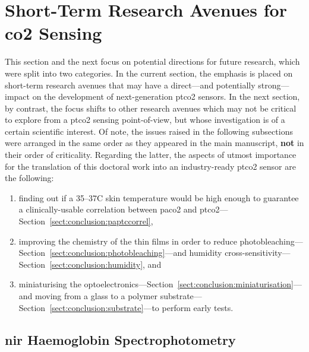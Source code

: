 \section{Short-Term Research Avenues for \texorpdfstring{\gls{co2}}{CO2} Sensing}\label{sect:conclusion:short_term}

This section and the next focus on potential directions for future research, which were split into two categories. In the current section, the emphasis is placed on short-term research avenues that may have a direct---and potentially strong---impact on the development of next-generation \gls{ptco2} sensors. In the next section, by contrast, the focus shifts to other research avenues which may not be critical to explore from a \gls{ptco2} sensing point-of-view, but whose investigation is of a certain scientific interest. Of note, the issues raised in the following subsections were arranged in the same order as they appeared in the main manuscript, \textbf{not} in their order of criticality. Regarding the latter, the aspects of utmost importance for the translation of this doctoral work into an industry-ready \gls{ptco2} sensor are the following:
\begin{enumerate}
	\item finding out if a 35--37{\degree}C skin temperature would be high enough to guarantee a clinically-usable correlation between \gls{paco2} and \gls{ptco2}---Section~\ref{sect:conclusion:paptccorrel},
	\item improving the chemistry of the thin films in order to reduce photobleaching---Section~\ref{sect:conclusion:photobleaching}---and humidity cross-sensitivity---Section~\ref{sect:conclusion:humidity}, and
	\item miniaturising the optoelectronics---Section~\ref{sect:conclusion:miniaturisation}---and moving from a glass to a polymer substrate---Section~\ref{sect:conclusion:substrate}---to perform early \invivo{} tests.
\end{enumerate}

\subsection{\texorpdfstring{\gls{nir}}{NIR} Haemoglobin Spectrophotometry}

